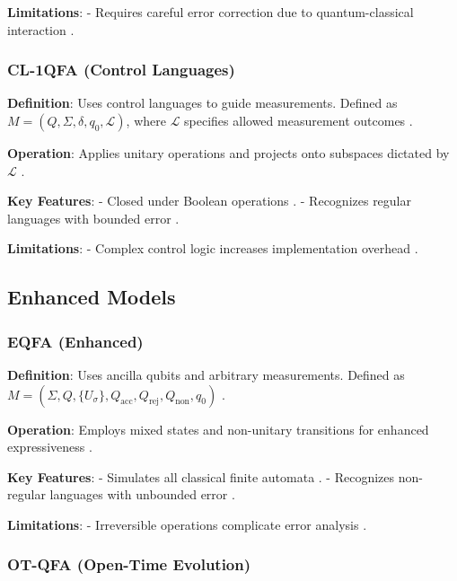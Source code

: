 \textbf{Limitations}: 
- Requires careful error correction due to quantum-classical interaction \cite{zheng2012one}.

\subsubsection{CL-1QFA (Control Languages)}
\label{sssec:cl-1qfa}

\textbf{Definition}: Uses control languages to guide measurements. Defined as \( M = (Q, \Sigma, \delta, q_0, \mathcal{L}) \), where \( \mathcal{L} \) specifies allowed measurement outcomes \cite{bertoni2003quantum}.

\textbf{Operation}: Applies unitary operations and projects onto subspaces dictated by \( \mathcal{L} \) \cite{bertoni2003quantum}.

\textbf{Key Features}:
- Closed under Boolean operations \cite{bertoni2003quantum}.
- Recognizes regular languages with bounded error \cite{bertoni2003quantum}.

\textbf{Limitations}: 
- Complex control logic increases implementation overhead \cite{bertoni2003quantum}.

\subsection{Enhanced Models}
\label{subsec:enhanced-models}

\subsubsection{EQFA (Enhanced)}
\label{sssec:eqfa}

\textbf{Definition}: Uses ancilla qubits and arbitrary measurements. Defined as \( M = (\Sigma, Q, \{U_\sigma\}, Q_{\text{acc}}, Q_{\text{rej}}, Q_{\text{non}}, q_0) \) \cite{paschen2000quantum}.

\textbf{Operation}: Employs mixed states and non-unitary transitions for enhanced expressiveness \cite{paschen2000quantum}.

\textbf{Key Features}:
- Simulates all classical finite automata \cite{paschen2000quantum}.
- Recognizes non-regular languages with unbounded error \cite{nayak1999optimal}.

\textbf{Limitations}: 
- Irreversible operations complicate error analysis \cite{nayak1999optimal}.

\subsubsection{OT-QFA (Open-Time Evolution)}
\label{sssec:ot-qfa}

